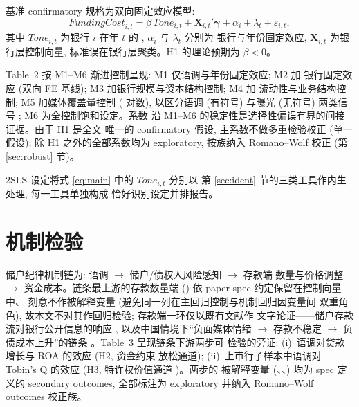 基准 confirmatory 规格为双向固定效应模型:
\begin{equation}\label{eq:main}
\mathit{FundingCost}_{i,t}
  = \beta\, \mathit{Tone}_{i,t}
  + \mathbf{X}_{i,t}'\boldsymbol{\gamma}
  + \alpha_i + \lambda_t + \varepsilon_{i,t},
\end{equation}
其中 $\mathit{Tone}_{i,t}$ 为银行 $i$ 在年 $t$ 的
, $\alpha_i$ 与 $\lambda_t$ 分别为
银行与年份固定效应, $\mathbf{X}_{i,t}$ 为银行层控制向量,
标准误在银行层聚类。H1 的理论预期为 $\beta < 0$。

Table~2 按 M1--M6 渐进控制呈现: M1 仅语调与年份固定效应; M2 加
银行固定效应 (双向 FE 基线); M3 加银行规模与资本结构控制; M4 加
流动性与业务结构控制; M5 加媒体覆盖量控制 (
对数), 以区分语调 (有符号) 与曝光 (无符号) 两类信号
\parencite{cookson2024socialsignal}; M6 为全控制饱和设定。系数
沿 M1--M6 的稳定性是选择性偏误有界的间接证据。由于 H1 是全文
唯一的 confirmatory 假设, 主系数不做多重检验校正 (单一假设);
除 H1 之外的全部系数均为 exploratory, 按族纳入 Romano--Wolf
校正 (第 \ref{sec:robust} 节)。

2SLS 设定将式 \eqref{eq:main} 中的 $\mathit{Tone}_{i,t}$ 分别以
第 \ref{sec:ident} 节的三类工具作内生处理, 每一工具单独构成
恰好识别设定并排报告。

\section{机制检验}\label{sec:mech}

储户纪律机制链为: 语调 $\to$ 储户/债权人风险感知 $\to$ 存款端
数量与价格调整 $\to$ 资金成本。链条最上游的存款数量端
() 依 paper spec 约定保留在控制向量中、
刻意不作被解释变量 (避免同一列在主回归控制与机制回归因变量间
双重角色), 故本文不对其作回归检验; 存款端一环仅以既有文献作
文字论证——储户存款流对银行公开信息的响应
\parencite{chen2022transparency}, 以及中国情境下``负面媒体情绪
$\to$ 存款不稳定 $\to$ 负债成本上升''的链条
\parencite{fang2024mediadeposit}。Table~3 呈现链条下游两步可
检验的旁证: (i)~语调对贷款增长与 ROA 的效应 (H2, 资金约束
放松通道); (ii)~上市行子样本中语调对 Tobin's Q 的效应 (H3,
特许权价值通道 \parencite{drechsler2026franchise})。两步的
被解释变量 (、、)
均为 spec 定义的 secondary outcomes, 全部标注为 exploratory
并纳入 Romano--Wolf outcomes 校正族。

